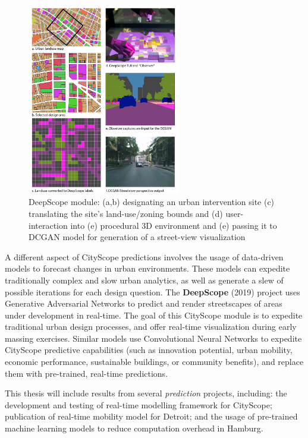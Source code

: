 \begin{figure}[t]
\begin{center}
    \includegraphics[width=0.6\textwidth]{figures/landuse.jpg}
\end{center}
   \caption{DeepScope module: (a,b) designating an urban intervention site (c) translating the site's land-use/zoning bounds and (d) user-interaction into (e) procedural 3D environment and (e) passing it to DCGAN model for generation of a street-view visualization}
\label{fig:landuse}
\end{figure}
{A different aspect of CityScope predictions involves the usage of data-driven models to forecast changes in urban environments. These models can expedite traditionally complex and slow urban analytics, as well as generate a slew of possible iterations for each design question. The \textbf{DeepScope} (2019) project uses Generative Adversarial Networks to predict and render streetscapes of areas under development in real-time. The goal of this CityScope module is to expedite traditional urban design processes, and offer real-time visualization during early massing exercises. Similar models use Convolutional Neural Networks to expedite CityScope predictive capabilities (such as innovation potential, urban mobility, economic performance, sustainable buildings, or community benefits), and replace them with pre-trained, real-time predictions.}

{This thesis will include results from several \textit{prediction} projects, including: the development and testing of real-time modelling framework for CityScope; publication of real-time mobility model for Detroit; and the usage of pre-trained machine learning models to reduce computation overhead in Hamburg.}

